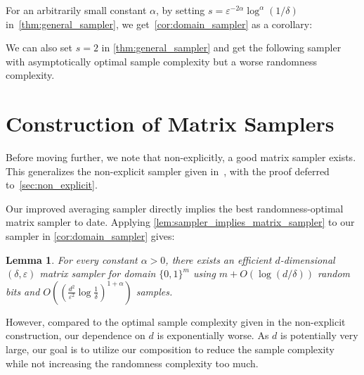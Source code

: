 \documentclass[11pt,letterpaper]{article}
\newtheorem{corollary}[theorem]{Corollary}
\newtheorem{lemma}[theorem]{Lemma}
\newtheorem{remark}[theorem]{Remark}
\newcommand{\eps}{\varepsilon}
\newcommand{\1}{\mathbbm{1}}
\newcommand{\zo}{\{0, 1\}}
\begin{document}

For an arbitrarily small constant $\alpha$,  by setting $s = \eps^{-2\alpha}\log^{\alpha}(1 / \delta)$ in~\cref{thm:general_sampler}, we get~\cref{cor:domain_sampler} as a corollary:
\CorollaryTwo*



We can also set $s = 2$ in \cref{thm:general_sampler} and get the following sampler with asymptotically optimal sample complexity but a worse randomness complexity. 

\optimalSampleSampler*






\section{Construction of Matrix Samplers}
Before moving further, we note that non-explicitly, 
a good matrix sampler exists.
This generalizes the non-explicit sampler given in~\cite{CEG95}, with the proof deferred to~\cref{sec:non_explicit}.

\nonExplicit*

Our improved averaging sampler directly implies the best randomness-optimal matrix sampler to date.
Applying \cref{lem:sampler_implies_matrix_sampler} to our sampler in \cref{cor:domain_sampler} gives:
\begin{lemma} 
\label{lem:ours_based_matrix_sampler}
    For every constant $\alpha > 0$, there exists an efficient $d$-dimensional $(\delta, \eps)$ matrix sampler for domain $\zo^m$ using $m + O(\log (d / \delta))$ random bits and $O((\frac{d^2}{\eps^2}\log\frac{1}{\delta})^{1+\alpha})$ samples.
\end{lemma}
However, compared to the optimal sample complexity given in the non-explicit construction, our dependence on $d$ is exponentially worse.
As $d$ is potentially very large, our goal is to utilize our composition to reduce the sample complexity while not increasing the randomness complexity too much.
\end{document}
